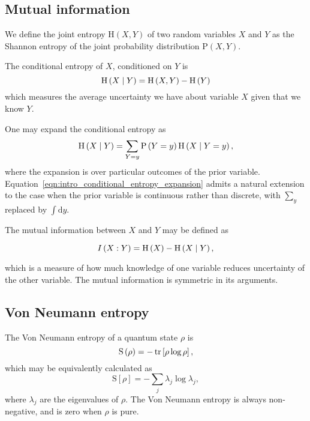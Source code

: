 \FloatBarrier
\subsection{Mutual information}
We define the joint entropy $\text{H}\left(X, Y\right)$ of two random variables $X$ and $Y$ as the Shannon entropy of the joint probability distribution $\text{P}\left(X, Y\right)$. 

The conditional entropy of $X$, conditioned on $Y$ is
\begin{equation}
\text{H}\left(X \; \middle| \; Y\right) = \text{H}\left(X, Y\right) - \text{H}\left(Y\right)
\end{equation}
which measures the average uncertainty we have about variable $X$ given that we know $Y$.

One may expand the conditional entropy as \cite{Wilde2013}
\begin{equation}\label{eqn:intro_conditional_entropy_expansion}
\text{H}\left(X \; \middle| \; Y\right) = \sum_{Y=y} \text{P}\left(Y=y\right) \text{H}\left( X \; \middle| \; Y=y \right),
\end{equation}
where the expansion is over particular outcomes of the prior variable. Equation~\ref{eqn:intro_conditional_entropy_expansion} admits a natural extension to the case when the prior variable is continuous rather than discrete, with $\sum_{y}$ replaced by $\int \mathrm{d}y$.


The mutual information between $X$ and $Y$ may be defined as

\begin{equation}\label{eqn:intro_mutual_information}
I\left(X : Y\right) = \text{H}\left(X\right) - \text{H}\left(X \; \middle| \; Y\right),
\end{equation}

\noindent which is a measure of how much knowledge of one variable reduces uncertainty of the other variable. The mutual information is symmetric in its arguments.


\FloatBarrier
\subsection{Von Neumann entropy}
The Von Neumann entropy of a quantum state $\rho$ is
\begin{equation}
\text{S}\left(\rho\right) = - \tr\left[\rho \log \rho \right],
\end{equation}
which may be equivalently calculated as
\begin{equation}\label{eqn:intro_von_neumann}
\text{S}\left[\rho\right] = - \sum_j \lambda_j \log \lambda_j,
\end{equation}
where $\lambda_j$ are the eigenvalues of $\rho$. The Von Neumann entropy is always non-negative, and is zero when $\rho$ is pure.

